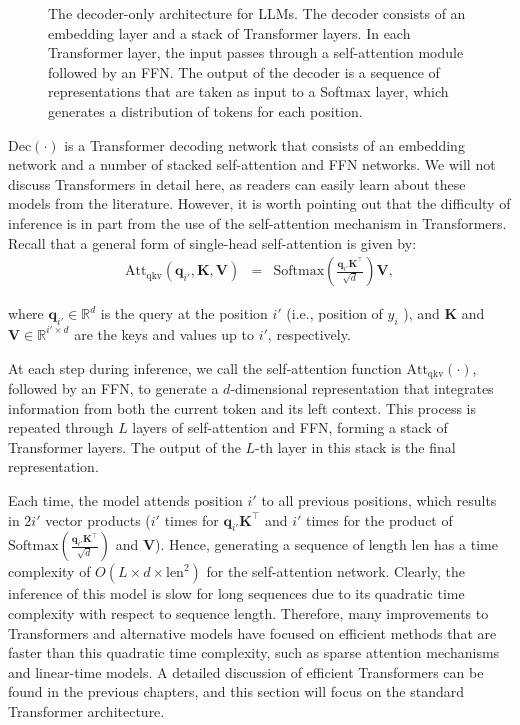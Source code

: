 \begin{figure}[!t]
\centering

\caption{The decoder-only architecture for LLMs. The decoder consists of an embedding layer and a stack of Transformer layers. In each Transformer layer, the input passes through a self-attention module followed by an FFN. The output of the decoder is a sequence of representations that are taken as input to a Softmax layer, which generates a distribution of tokens for each position.}
\label{fig:llm-transformer-decoder-achitecture}
\end{figure}

$\mathrm{Dec}(\cdot)$ is a Transformer decoding network that consists of an embedding network and a number of stacked self-attention and FFN networks. We will not discuss Transformers in detail here, as readers can easily learn about these models from the literature. However, it is worth pointing out that the difficulty of inference is in part from the use of the self-attention mechanism in Transformers. Recall that a general form of single-head self-attention is given by:
\begin{eqnarray}
\mathrm{Att}_{\mathrm{qkv}}(\mathbf{q}_{i'},\mathbf{K},\mathbf{V}) & = & \mathrm{Softmax}(\frac{\mathbf{q}_{i'} \mathbf{K}^{\top}}{\sqrt{d}}) \mathbf{V}, \label{eq:llm-single-head-qkv-attention}
\end{eqnarray}

\noindent where $\mathbf{q}_{i'} \in \mathbb{R}^{d}$ is the query at the position $i'$ (i.e., position of $y_i$ ), and $\mathbf{K}$ and $\mathbf{V} \in \mathbb{R}^{i' \times d}$ are the keys and values up to $i'$, respectively.

At each step during inference, we call the self-attention function $\mathrm{Att}_{\mathrm{qkv}}(\cdot)$, followed by an FFN, to generate a $d$-dimensional representation that integrates information from both the current token and its left context. This process is repeated through $L$ layers of self-attention and FFN, forming a stack of Transformer layers. The output of the $L$-th layer in this stack is the final representation.

Each time, the model attends position $i'$ to all previous positions, which results in $2 i'$ vector products ($i'$ times for $\mathbf{q}_{i'} \mathbf{K}^{\top}$ and $i'$ times for the product of $\mathrm{Softmax}(\frac{\mathbf{q}_{i'} \mathbf{K}^{\top}}{\sqrt{d}})$ and $\mathbf{V}$). Hence, generating a sequence of length $\mathrm{len}$ has a time complexity of $O(L \times d \times \mathrm{len}^2)$ for the self-attention network. Clearly, the inference of this model is slow for long sequences due to its quadratic time complexity with respect to sequence length. Therefore, many improvements to Transformers and alternative models have focused on efficient methods that are faster than this quadratic time complexity, such as sparse attention mechanisms and linear-time models. A detailed discussion of efficient Transformers can be found in the previous chapters, and this section will focus on the standard Transformer architecture.

